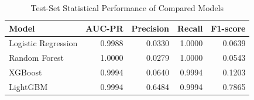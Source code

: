 \begin{table}[H]
\centering
\caption{Test-Set Statistical Performance of Compared Models}
\label{tab:test_statistical_performance}
\begin{tabular}{lrrrr}
\hline
\textbf{Model} & \textbf{AUC-PR} & \textbf{Precision} & \textbf{Recall} & \textbf{F1-score} \\
\hline
Logistic Regression & 0.9988 & 0.0330 & 1.0000 & 0.0639 \\
Random Forest & 1.0000 & 0.0279 & 1.0000 & 0.0543 \\
XGBoost & 0.9994 & 0.0640 & 0.9994 & 0.1203 \\
LightGBM & 0.9994 & 0.6484 & 0.9994 & 0.7865 \\
\hline
\end{tabular}
\end{table}